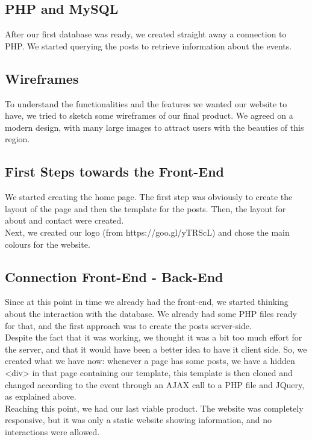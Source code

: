\documentclass[a4paper]{article}
\begin{document}
	\subsection{PHP and MySQL}
	After our first database was ready, we created straight away a connection to PHP. We started querying the posts to retrieve information about the events.
	
	\subsection{Wireframes}
	To understand the functionalities and the features we wanted our website to have, we tried to sketch some wireframes of our final product. We agreed on a modern design, with many large images to attract users with the beauties of this region. 
	
	\subsection{First Steps towards the Front-End}
	We started creating the home page. The first step was obviously to create the layout of the page and then the template for the posts. Then, the layout for about and contact were created.\\
	Next, we created our logo (from https://goo.gl/yTRScL) and chose the main colours for the website.
	
	\subsection{Connection Front-End - Back-End}
	Since at this point in time we already had the front-end, we started thinking about the interaction with the database. We already had some PHP files ready for that, and the first approach was to create the posts server-side.\\
	Despite the fact that it was working, we thought it was a bit too much effort for the server, and that it would have been a better idea to have it client side. So, we created what we have now: whenever a page has some posts, we have a hidden <div> in that page containing our template, this template is then cloned and changed according to the event through an AJAX call to a PHP file and JQuery, as explained above.\\
	Reaching this point, we had our last viable product. The website was completely responsive, but it was only a static website showing information, and no interactions were allowed.
\end{document}
